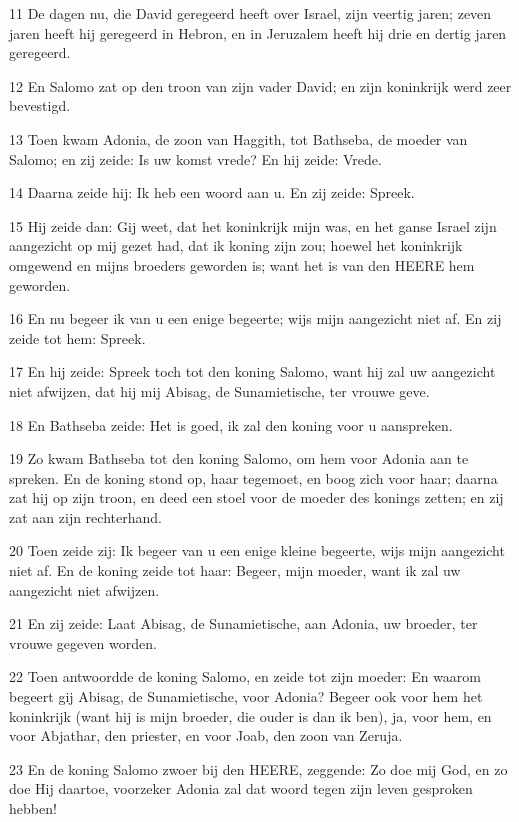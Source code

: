 \par 11 De dagen nu, die David geregeerd heeft over Israel, zijn veertig jaren; zeven jaren heeft hij geregeerd in Hebron, en in Jeruzalem heeft hij drie en dertig jaren geregeerd.
\par 12 En Salomo zat op den troon van zijn vader David; en zijn koninkrijk werd zeer bevestigd.
\par 13 Toen kwam Adonia, de zoon van Haggith, tot Bathseba, de moeder van Salomo; en zij zeide: Is uw komst vrede? En hij zeide: Vrede.
\par 14 Daarna zeide hij: Ik heb een woord aan u. En zij zeide: Spreek.
\par 15 Hij zeide dan: Gij weet, dat het koninkrijk mijn was, en het ganse Israel zijn aangezicht op mij gezet had, dat ik koning zijn zou; hoewel het koninkrijk omgewend en mijns broeders geworden is; want het is van den HEERE hem geworden.
\par 16 En nu begeer ik van u een enige begeerte; wijs mijn aangezicht niet af. En zij zeide tot hem: Spreek.
\par 17 En hij zeide: Spreek toch tot den koning Salomo, want hij zal uw aangezicht niet afwijzen, dat hij mij Abisag, de Sunamietische, ter vrouwe geve.
\par 18 En Bathseba zeide: Het is goed, ik zal den koning voor u aanspreken.
\par 19 Zo kwam Bathseba tot den koning Salomo, om hem voor Adonia aan te spreken. En de koning stond op, haar tegemoet, en boog zich voor haar; daarna zat hij op zijn troon, en deed een stoel voor de moeder des konings zetten; en zij zat aan zijn rechterhand.
\par 20 Toen zeide zij: Ik begeer van u een enige kleine begeerte, wijs mijn aangezicht niet af. En de koning zeide tot haar: Begeer, mijn moeder, want ik zal uw aangezicht niet afwijzen.
\par 21 En zij zeide: Laat Abisag, de Sunamietische, aan Adonia, uw broeder, ter vrouwe gegeven worden.
\par 22 Toen antwoordde de koning Salomo, en zeide tot zijn moeder: En waarom begeert gij Abisag, de Sunamietische, voor Adonia? Begeer ook voor hem het koninkrijk (want hij is mijn broeder, die ouder is dan ik ben), ja, voor hem, en voor Abjathar, den priester, en voor Joab, den zoon van Zeruja.
\par 23 En de koning Salomo zwoer bij den HEERE, zeggende: Zo doe mij God, en zo doe Hij daartoe, voorzeker Adonia zal dat woord tegen zijn leven gesproken hebben!
